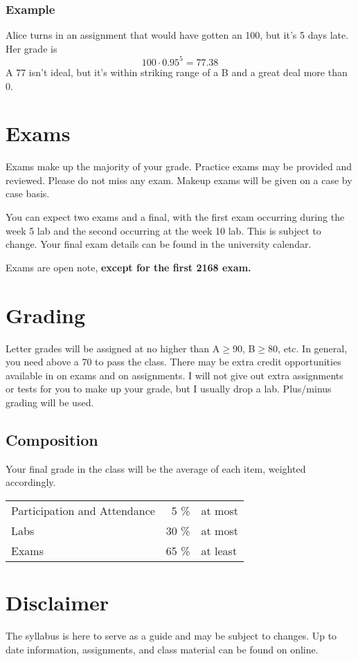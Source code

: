 \documentclass[10pt, letter]{article}
\begin{document}
\subsubsection*{Example}
Alice turns in an assignment that would have gotten an 100, but it's 5 days late.  Her grade is $$100\cdot 0.95^{5} = 77.38$$ A 77 isn't ideal, but it's within striking range of a B and a great deal more than 0.

\section{Exams}
Exams make up the majority of your grade.
Practice exams may be provided and reviewed.  
Please do not miss any exam.  
Makeup exams will be given on a case by case basis.


You can expect two exams and a final, with the first exam occurring during the week 5 lab and the second occurring at the week 10 lab.
This is subject to change.
Your final exam details can be found in the university calendar.

Exams are open note, \textbf{except for the first 2168 exam.}

\section*{Grading}

Letter grades will be assigned at no higher than A$\geq$90, B$\geq$80, etc.
In general, you need above a 70 to pass the class.
There may be extra credit opportunities available in on exams and on assignments.
I will not give out extra assignments or tests for you to make up your grade, but I usually drop a lab.
Plus/minus grading will be used.
\subsection*{Composition}
Your final grade in the class will be the average of each item, weighted accordingly.

\begin{tabular}{ l  r l}
	Participation and Attendance & 5 \% & at most \\
	Labs & 30 \% & at most \\
	Exams & 65 \% & at least \\
\end{tabular}

\section*{Disclaimer}
The syllabus is here to serve as a guide and may be subject to changes.  Up to date information, assignments, and class material can be found on online.
\end{document}
